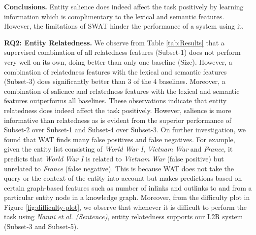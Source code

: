 \textbf{Conclusions.}
Entity salience does indeed affect the task positively by learning information which is complimentary to the lexical and semantic features. However, the limitations of SWAT hinder the performance of a system using it.


\textbf{RQ2: Entity Relatedness.}
We observe from Table \ref{tab:Results} that a supervised combination of all relatedness features (Subset-1) does not perform very well on its own, doing better than only one baseline (Size). However, a combination of relatedness features with the lexical and semantic features (Subset-3) does significantly better than 3 of the 4 baselines. Moreover, a combination of salience and relatedness features with the lexical and semantic features outperforms all baselines. 
These observations indicate that entity relatedness does indeed affect the task positively. However, salience is more informative than relatedness as is evident from the superior performance of Subset-2 over Subset-1 and Subset-4 over Subset-3. On further investigation, we found that WAT finds many false positives and false negatives. For example, given the entity list consisting of  \textit{World War I}, \textit{Vietnam War} and \textit{France}, it predicts that \textit{World War I} is related to \textit{Vietnam War} (false positive) but  unrelated to \textit{France} (false negative). This is because WAT does not take
the query or the context of the entity into account but makes predictions based on certain graph-based features such as number of inlinks and outlinks to and from a particular entity node in a knowledge graph. Moreover, from the difficulty plot in Figure \ref{fig:difficulty-plot}, we observe that whenever it is difficult to perform the task using \textit{Nanni et al. (Sentence)}, entity relatedness supports our L2R system (Subset-3 and Subset-5).


